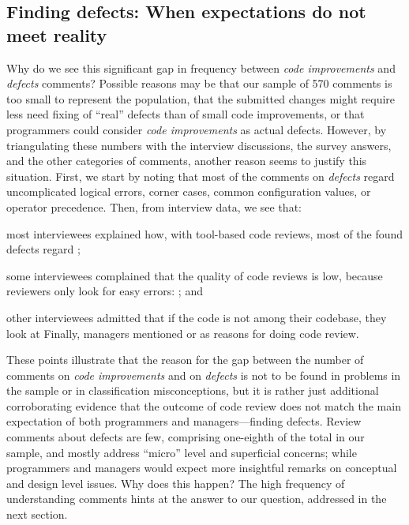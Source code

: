\subsection{Finding defects: When expectations do not meet reality}

Why do we see this significant gap in frequency between \emph{code improvements} and \emph{defects} comments? Possible reasons may be that our sample of 570 comments is too small to represent the population, that the submitted changes might require less need fixing of ``real'' defects than of small code improvements, or that programmers could consider \emph{code improvements} as actual defects. However, by triangulating these numbers with the interview discussions, the survey answers, and the other categories of comments, another reason seems to justify this situation. First, we start by noting that most of the comments on \emph{defects} regard uncomplicated logical errors, \eg corner cases, common configuration values, or operator precedence. Then, from interview data, we see that: \begin{inparaenum}[(1)]
\item most interviewees explained how, with tool-based code reviews, most of the found defects regard ; 
\item some interviewees complained that the quality of code reviews is low, because reviewers only look for easy errors: ; and 
\item other interviewees admitted that if the code is not among their codebase, they look at  Finally, managers mentioned  or  as reasons for doing code review.
\end{inparaenum}
These points illustrate that the reason for the gap between the number of comments on \emph{code improvements} and on \emph{defects} is not to be found in problems in the sample or in classification misconceptions, but it is rather just additional corroborating evidence that the outcome of code review does not match the main expectation of both programmers and managers—finding defects. Review comments about defects are few, comprising one-eighth of the total in our sample, and mostly address ``micro'' level and superficial concerns; while programmers and managers would expect more insightful remarks on conceptual and design level issues. Why does this happen? The high frequency of understanding comments hints at the answer to our question, addressed in the next section.
